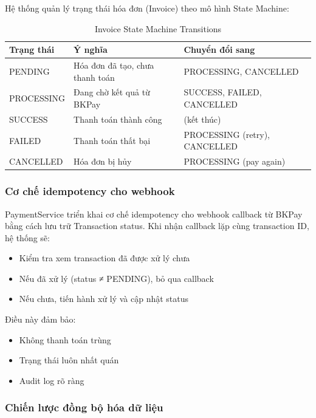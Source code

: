 Hệ thống quản lý trạng thái hóa đơn (Invoice) theo mô hình State Machine:

\begin{table}[H]
    \centering
    \begin{tabularx}{\textwidth}{|l|X|l|}
    \hline
    \textbf{Trạng thái} & \textbf{Ý nghĩa} & \textbf{Chuyển đổi sang} \\
    \hline
    PENDING & Hóa đơn đã tạo, chưa thanh toán & PROCESSING, CANCELLED \\
    PROCESSING & Đang chờ kết quả từ BKPay & SUCCESS, FAILED, CANCELLED \\
    SUCCESS & Thanh toán thành công & (kết thúc) \\
    FAILED & Thanh toán thất bại & PROCESSING (retry), CANCELLED \\
    CANCELLED & Hóa đơn bị hủy & PROCESSING (pay again) \\
    \hline
    \end{tabularx}
    \caption{Invoice State Machine Transitions}
    \label{invoice_state}
\end{table}

\subsubsection{Cơ chế idempotency cho webhook}

PaymentService triển khai cơ chế idempotency cho webhook callback từ BKPay bằng cách lưu trữ Transaction status. Khi nhận callback lặp cùng transaction ID, hệ thống sẽ:
\begin{itemize}
    \item Kiểm tra xem transaction đã được xử lý chưa
    \item Nếu đã xử lý (status ≠ PENDING), bỏ qua callback
    \item Nếu chưa, tiến hành xử lý và cập nhật status
\end{itemize}

Điều này đảm bảo:
\begin{itemize}
    \item Không thanh toán trùng
    \item Trạng thái luôn nhất quán
    \item Audit log rõ ràng
\end{itemize}

\subsubsection{Chiến lược đồng bộ hóa dữ liệu}

